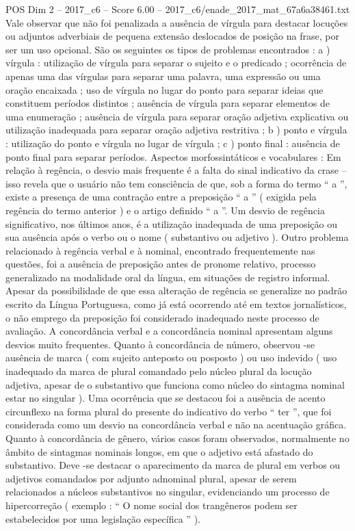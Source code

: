 \begin{textsample}{POS Dim 2 – 2017\_c6 – Score 6.00 – 2017\_c6/enade\_2017\_mat\_67a6a38461.txt}
Vale observar que não foi penalizada a ausência de vírgula para destacar locuções ou adjuntos adverbiais de pequena extensão deslocados de posição na frase, por ser um uso opcional.
São os seguintes os tipos de problemas encontrados : a ) vírgula : utilização de vírgula para separar o sujeito e o predicado ; ocorrência de apenas uma das vírgulas para separar uma palavra, uma expressão ou uma oração encaixada ; uso de vírgula no lugar do ponto para separar ideias que constituem períodos distintos ; ausência de vírgula para separar elementos de uma enumeração ; ausência de vírgula para separar oração adjetiva explicativa ou utilização inadequada para separar oração adjetiva restritiva ; b ) ponto e vírgula : utilização do ponto e vírgula no lugar de vírgula ; c ) ponto final : ausência de ponto final para separar períodos.
Aspectos morfossintáticos e vocabulares : Em relação à regência, o desvio mais frequente é a falta do sinal indicativo da crase – isso revela que o usuário não tem consciência de que, sob a forma do termo “ a ”, existe a presença de uma contração entre a preposição “ a ” ( exigida pela regência do termo anterior ) e o artigo definido “ a ”.
Um desvio de regência significativo, nos últimos anos, é a utilização inadequada de uma preposição ou sua ausência após o verbo ou o nome ( substantivo ou adjetivo ).
Outro problema relacionado à regência verbal e à nominal, encontrado frequentemente nas questões, foi a ausência de preposição antes de pronome relativo, processo generalizado na modalidade oral da língua, em situações de registro informal.
Apesar da possibilidade de que essa alteração de regência se generalize no padrão escrito da Língua Portuguesa, como já está ocorrendo até em textos jornalísticos, o não emprego da preposição foi considerado inadequado neste processo de avaliação.
A concordância verbal e a concordância nominal apresentam alguns desvios muito frequentes.
Quanto à concordância de número, observou -se ausência de marca ( com sujeito anteposto ou posposto ) ou uso indevido ( uso inadequado da marca de plural comandado pelo núcleo plural da locução adjetiva, apesar de o substantivo que funciona como núcleo do sintagma nominal estar no singular ).
Uma ocorrência que se destacou foi a ausência de acento circunflexo na forma plural do presente do indicativo do verbo “ ter ”, que foi considerada como um desvio na concordância verbal e não na acentuação gráfica.
Quanto à concordância de gênero, vários casos foram observados, normalmente no âmbito de sintagmas nominais longos, em que o adjetivo está afastado do substantivo.
Deve -se destacar o aparecimento da marca de plural em verbos ou adjetivos comandados por adjunto adnominal plural, apesar de serem relacionados a núcleos substantivos no singular, evidenciando um processo de hipercorreção ( exemplo : “ O nome social dos trangêneros podem ser estabelecidos por uma legislação específica ” ).

\end{textsample}
